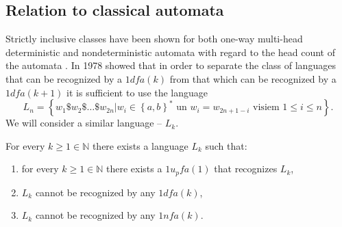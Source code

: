 \documentclass{llncs}
\begin{document}
\subsection{Relation to classical automata}
Strictly inclusive classes have been shown for both one-way multi-head deterministic and nondeterministic automata with regard to the head count of the automata \citep{Holzer2009,Yao1978}. In 1978 \citet{Yao1978} showed that in order to separate the class of languages that can be recognized by a $1dfa(k)$ from that which can be recognized by a $1dfa(k+1)$ it is sufficient to use the language
\[
	L_n = \left\{w_1\$w_2\$ \ldots \$w_{2n} | w_i \in \left\{a,b\right\}^* \textrm{ un } w_i = w_{2n+1−i} \textrm{ visiem } 1 \leq i \leq n \right\}.
\]
We will consider a similar language -- $L_k$.
\begin{theorem}
For every $k \geq 1 \in \mathbb{N}$ there exists a language $L_k$ such that:
\begin{enumerate}[label={(\arabic*)}]
	\item for every $k \geq 1 \in \mathbb{N}$ there exists a $1u_pfa(1)$ that recognizes $L_k$,
	\item $L_k$ cannot be recognized by any $1dfa(k)$,
	\item $L_k$ cannot be recognized by any $1nfa(k)$.
\end{enumerate}
\end{theorem}
\end{document}
